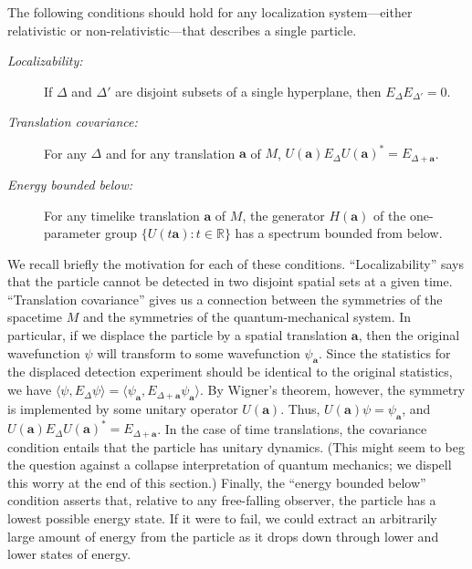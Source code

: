 \documentclass[11pt]{article}
\theoremstyle{remark}
\begin{document}
The following conditions should hold for any localization
system---either relativistic or non-relativistic---that describes a
single particle.
\begin{description}
\item[{\it Localizability:}] If $\Delta $ and $\Delta '$ are disjoint
  subsets of a single hyperplane, then \newline
  \mbox{$E_{\Delta}E_{\Delta '}=0$}.
\item[{\it Translation covariance:}] For any $\Delta$ and for any
  translation $\mathbf{a}$ of $M$, \newline
  $U(\mathbf{a})E_{\Delta}U(\mathbf{a})^{*}=E_{\Delta +\mathbf{a}}$.
\item[{\it Energy bounded below:}] For any timelike translation
  $\mathbf{a}$ of $M$, the generator $H(\mathbf{a})$ of the
  one-parameter group $\{ U(t\mathbf{a}):t\in \mathbb{R} \}$ has a
  spectrum bounded from below. \end{description} We recall briefly the
motivation for each of these conditions.  ``Localizability'' says that
the particle cannot be detected in two disjoint spatial sets at a
given time.  ``Translation covariance'' gives us a connection between
the symmetries of the spacetime $M$ and the symmetries of the
quantum-mechanical system.  In particular, if we displace the particle
by a spatial translation $\mathbf{a}$, then the original wavefunction
$\psi$ will transform to some wavefunction $\psi _{\mathbf{a}}$.
Since the statistics for the displaced detection experiment should be
identical to the original statistics, we have $\langle \psi
,E_{\Delta}\psi \rangle =\langle \psi _{\mathbf{a}},E_{\Delta
  +\mathbf{a}}\psi _{\mathbf{a}}\rangle$.  By Wigner's theorem,
however, the symmetry is implemented by some unitary operator
$U(\mathbf{a})$.  Thus, $U(\mathbf{a})\psi =\psi _{\mathbf{a}}$, and
$U(\mathbf{a})E_{\Delta}U(\mathbf{a})^{*}=E_{\Delta +\mathbf{a}}$.  In
the case of time translations, the covariance condition entails that
the particle has unitary dynamics.  (This might seem to beg the
question against a collapse interpretation of quantum mechanics; we
dispell this worry at the end of this section.)  Finally, the ``energy
bounded below'' condition asserts that, relative to any free-falling
observer, the particle has a lowest possible energy state.  If it were
to fail, we could extract an arbitrarily large amount of energy from
the particle as it drops down through lower and lower states of
energy.
\end{document}
